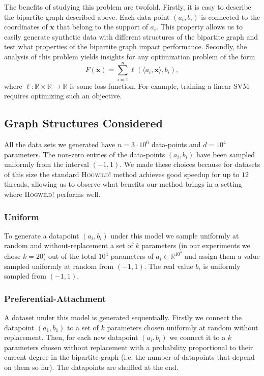 \documentclass[times,11pt]{article}
\numberwithin{equation}{section}		%
\numberwithin{figure}{section}			%
\numberwithin{table}{section}				%
\newcommand{\xvec}{\mathbf{x}}
\newcommand{\HW}{\textsc{Hogwild!}}
\newcommand{\RR}{\mathbb{R}}
\begin{document}
The benefits of studying this problem are twofold. Firstly, it is easy to describe the bipartite graph described above. Each data point $(a_i,b_i)$ is connected to the coordinates of $\xvec$ that belong to the support of $a_i$. This property allows us to easily generate synthetic data with different structures of the bipartite graph and test what properties of the bipartite graph impact performance. Secondly, the analysis of this problem yields insights for any optimization problem of the form 
\begin{equation}
F(\xvec) = \sum_{i = 1}^n \ell (\langle a_i, \xvec\rangle, b_i),
\end{equation}
where $\ell \colon \RR \times \RR \rightarrow \RR$ is some loss function. For example, training a linear SVM requires optimizing such an objective. 


\subsection{Graph Structures Considered}

All the data sets we generated have $n = 3\cdot 10^6$ data-points and $d = 10^4$ parameters. The non-zero entries of the data-points $(a_i, b_i)$ have been sampled uniformly from the interval $(-1,1)$.  We made these choices because for datasets of this size the standard \HW{} method achieves good speedup for up to $12$ threads, allowing us to observe what benefits our method brings in a setting where \HW{} performs well. 

\subsubsection*{Uniform}

To generate a datapoint $(a_i, b_i)$ under this model we sample uniformly at random and without-replacement a set of $k$ parameters (in our experiments we chose $k = 20$) out of the total $10^4$ parameters of $a_i\in \RR^{10^4}$ and assign them a value sampled uniformly at random from $(-1,1)$. The real value $b_i$ is uniformly sampled from $(-1,1)$. 


\subsubsection*{Preferential-Attachment}

A dataset under this model is generated sequentially. Firstly we connect the datapoint $(a_1, b_1)$ to a set of $k$ parameters chosen uniformly at random without replacement. Then, for each new datapoint $(a_i, b_i)$ we connect it to a $k$ parameters chosen without replacement with a probability proportional to their current degree in the bipartite graph (i.e. the number of datapoints that depend on them so far). The datapoints are shuffled at the end.
\end{document}
